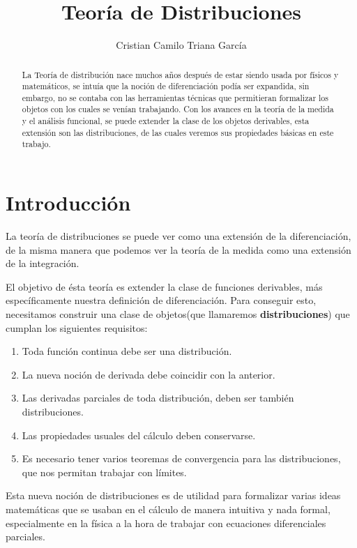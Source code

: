 \documentclass[letter,12pt]{article}
\title{Teoría de Distribuciones}
\author{Cristian Camilo Triana García}
\begin{document}
\maketitle

\begin{abstract}\normalsize
La Teoría de distribución nace muchos años después de estar
siendo usada por físicos y matemáticos, se intuía que la noción
de diferenciación podía ser expandida, sin embargo, no se contaba
con las herramientas técnicas que permitieran formalizar los objetos
con los cuales se venían trabajando. Con los avances en la teoría de
la medida y el análisis funcional, se puede extender la clase 
de los objetos derivables, esta extensión son las distribuciones,
de las cuales veremos sus propiedades básicas en este trabajo.
\end{abstract}




\section{Introducción}
La teoría de distribuciones se puede ver como una extensión de la diferenciación,
de la misma manera que podemos ver la teoría de la medida como una extensión de la
integración.

El objetivo de ésta teoría es extender la clase de funciones derivables, más específicamente
nuestra definición de diferenciación. Para conseguir esto, necesitamos construir
una clase de objetos(que llamaremos \textbf{distribuciones}) que cumplan los siguientes requisitos:

\begin{enumerate}
	\item Toda función continua debe ser una distribución.
	\item La nueva noción de derivada debe coincidir con la anterior.
	\item Las derivadas parciales de toda distribución, deben ser también distribuciones.
	\item Las propiedades usuales del cálculo deben conservarse.
	\item Es necesario tener varios teoremas de convergencia para las distribuciones,
		que nos permitan trabajar con límites.
\end{enumerate}

Esta nueva noción de distribuciones es de utilidad para formalizar varias ideas matemáticas que se usaban en el cálculo de manera intuitiva y nada formal, especialmente en la física a la hora de trabajar con ecuaciones diferenciales parciales. 
\end{document}

